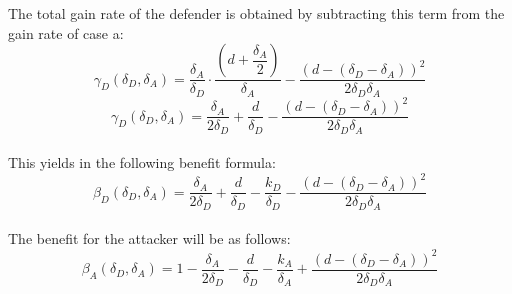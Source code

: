 The total gain  rate of the defender is obtained by subtracting this term from the gain rate of case a:
 \begin{equation*}
\gamma_{D}(\delta_{D},\delta_{A}) = \dfrac{\delta_{A}}{\delta_{D}} \cdot \dfrac{(d+\dfrac{\delta_{A}}{2})}{\delta_{A}} - \dfrac{(d - (\delta_{D} - \delta_{A}))^{2}}{2 \delta_{D} \delta_{A}}
\end{equation*}
\begin{equation*}
\gamma_{D}(\delta_{D},\delta_{A}) = \dfrac{\delta_{A}}{2\delta_{D}} + \dfrac{d}{\delta_{D}} - \dfrac{(d - (\delta_{D} - \delta_{A}))^{2}}{2 \delta_{D} \delta_{A}}
\end{equation*}\\
This yields in the following benefit formula:
\begin{equation*}
\beta_{D}(\delta_{D},\delta_{A}) = \dfrac{\delta_{A}}{2\delta_{D}} + \dfrac{d}{\delta_{D}} - \dfrac{k_{D}}{ \delta_{D}} - \dfrac{(d - (\delta_{D} - \delta_{A}))^{2}}{2 \delta_{D} \delta_{A}}
\end{equation*}\\
 
The benefit for the attacker will be as follows:
\begin{equation*}
\beta_{A}(\delta_{D},\delta_{A}) = 1 -\dfrac{\delta_{A}}{2\delta_{D}} - \dfrac{d}{\delta_{D}} - \dfrac{k_{A}}{ \delta_{A}} + \dfrac{(d - (\delta_{D} - \delta_{A}))^{2}}{2 \delta_{D} \delta_{A}}
\end{equation*}\\

